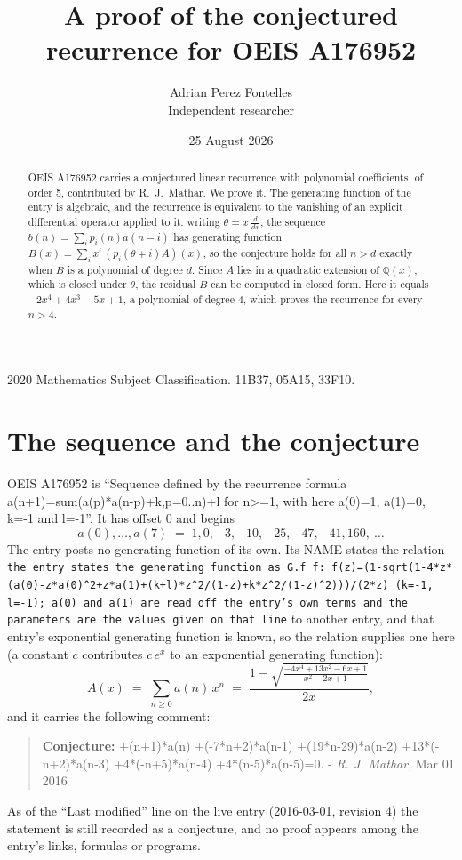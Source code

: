 \documentclass[11pt,a4paper]{article}
\title{A proof of the conjectured recurrence for OEIS A176952}
\author{Adrian Perez Fontelles\\ \small Independent researcher}
\date{25 August 2026}
\theoremstyle{plain}
\theoremstyle{definition}
\begin{document}
\maketitle

\begin{abstract}
OEIS A176952 carries a conjectured linear recurrence with polynomial coefficients, of
order 5, contributed by R.~J.~Mathar. We prove it. The generating function of the
entry is algebraic, and the recurrence is equivalent to the vanishing of an explicit
differential operator applied to it: writing $\theta=x\,\frac{d}{dx}$, the sequence
$b(n)=\sum_{i}p_{i}(n)a(n-i)$ has generating function
$B(x)=\sum_{i}x^{i}\,(p_{i}(\theta+i)A)(x)$, so the conjecture holds for all $n>d$ exactly
when $B$ is a polynomial of degree $d$. Since $A$ lies in a quadratic extension of
$\mathbb{Q}(x)$, which is closed under $\theta$, the residual $B$ can be computed in
closed form. Here it equals $- 2 x^{4} + 4 x^{3} - 5 x + 1$, a polynomial of degree $4$, which proves
the recurrence for every $n>4$.
\end{abstract}

\noindent\small 2020 Mathematics Subject Classification. 11B37, 05A15, 33F10.\normalsize

\section{The sequence and the conjecture}

OEIS A176952 is ``Sequence defined by the recurrence formula a(n+1)=sum(a(p)*a(n-p)+k,p=0..n)+l for n>=1, with here a(0)=1, a(1)=0, k=-1 and l=-1''. It has offset $0$ and begins
\[
a(0),\dots,a(7)\;=\;1, 0, -3, -10, -25, -47, -41, 160,\ \dots
\]
The entry posts no generating function of its own. Its NAME states the
relation \texttt{the entry states the generating function as G.f f: f(z)=(1-sqrt(1-4*z*(a(0)-z*a(0)\textasciicircum{}2+z*a(1)+(k+l)*z\textasciicircum{}2/(1-z)+k*z\textasciicircum{}2/(1-z)\textasciicircum{}2)))/(2*z) (k=-1, l=-1); a(0) and a(1) are read off the entry's own terms and the parameters are the values given on that line} to another entry, and that entry's exponential generating
function is known, so the relation supplies one here (a constant $c$ contributes
$c\,e^{x}$ to an exponential generating function):
\begin{equation}\label{eq:gf}
A(x)\;=\;\sum_{n\ge 0} a(n)\,x^{n}\;=\;\frac{1 - \sqrt{\frac{- 4 x^{4} + 13 x^{2} - 6 x + 1}{x^{2} - 2 x + 1}}}{2 x} ,
\end{equation}
and it carries the following comment:
\begin{quote}\small
\textbf{Conjecture:} +(n+1)*a(n) +(-7*n+2)*a(n-1) +(19*n-29)*a(n-2) +13*(-n+2)*a(n-3) +4*(-n+5)*a(n-4) +4*(n-5)*a(n-5)=0. - \emph{R. J. Mathar}, Mar 01 2016
\end{quote}
As of the ``Last modified'' line on the live entry (2016-03-01, revision 4) the
statement is still recorded as a conjecture, and no proof appears among the entry's links,
formulas or programs.
\end{document}
